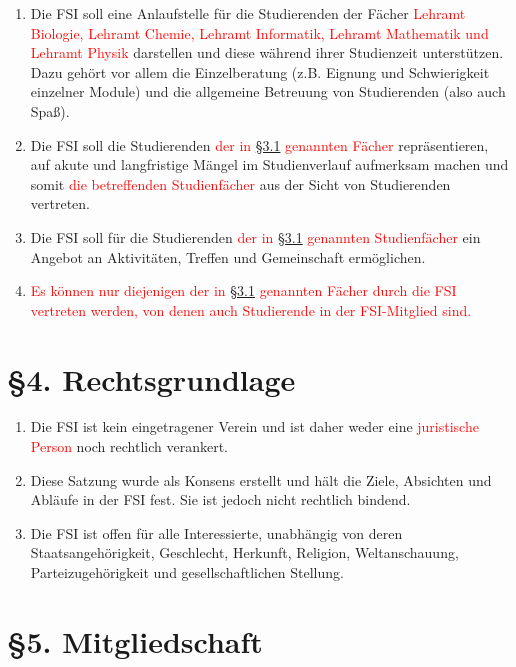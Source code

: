 \documentclass[a4paper,12pt]{article}
\newcommand{\red}[1]{\textcolor{red}{#1}}
\begin{document}
\begin{enumerate}
	\item
		\label{3.1}
		Die FSI soll eine Anlaufstelle für die Studierenden der Fächer \red{Lehramt Biologie, Lehramt Chemie, Lehramt Informatik, Lehramt Mathematik und Lehramt Physik}
		darstellen und diese während ihrer Studienzeit
		unterstützen. Dazu gehört vor allem die Einzelberatung (z.B.
		Eignung und Schwierigkeit einzelner Module) und die allgemeine
		Betreuung von Studierenden (also auch Spaß).
	\item
		Die FSI soll die Studierenden \red{der in \hyperref[3.1]{§3.1} genannten Fächer}
		repräsentieren, auf akute und langfristige Mängel im
		Studienverlauf aufmerksam machen und somit \red{die betreffenden Studienfächer} aus der Sicht von Studierenden vertreten.
	\item
		Die FSI soll für die Studierenden \red{der in \hyperref[3.1]{§3.1} genannten Studienfächer}
		ein Angebot an Aktivitäten, Treffen und Gemeinschaft
		ermöglichen.
		\item 
		\red{Es können nur diejenigen der in \hyperref[3.1]{§3.1} genannten Fächer durch die FSI vertreten werden, von denen auch Studierende in der FSI-Mitglied sind.}

\end{enumerate}

\section*{§4. Rechtsgrundlage}

\begin{enumerate}
	\item
		Die FSI ist kein eingetragener Verein und ist daher weder eine \red{
		juristische Person} noch rechtlich verankert.
	\item
		Diese Satzung wurde als Konsens erstellt und hält die Ziele,
		Absichten und Abläufe in der FSI fest. Sie ist jedoch nicht
		rechtlich bindend.
    	\item
		Die FSI ist offen für alle Interessierte, unabhängig von deren
		Staatsangehörigkeit, Geschlecht, Herkunft, Religion,
		Weltanschauung, Parteizugehörigkeit und gesellschaftlichen
		Stellung.
\end{enumerate}

\section*{§5. Mitgliedschaft}
\end{document}
